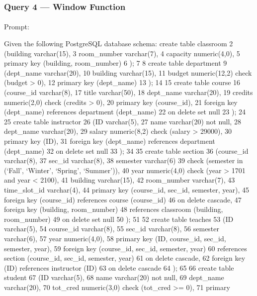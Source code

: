 \documentclass[
  letterpaper,
  DIV=11,
  numbers=noendperiod]{scrartcl}
\makeatletter
\let\oldparagraph\paragraph
\renewcommand{\paragraph}{
    \@ifstar
      \xxxParagraphStar
      \xxxParagraphNoStar
  }
\newcommand{\xxxParagraphStar}[1]{\oldparagraph*{#1}\mbox{}}
\newcommand{\xxxParagraphNoStar}[1]{\oldparagraph{#1}\mbox{}}
\makeatother
\begin{document}
\subsubsection{\texorpdfstring{\textbf{Query 4 ---} Window
Function}{Query 4 --- Window Function}}\label{query-4-window-function}

\paragraph{Prompt:}\label{prompt-3}

Given the following PostgreSQL database schema: create table classroom 2
(building varchar(15), 3 room\_number varchar(7), 4 capacity
numeric(4,0), 5 primary key (building, room\_number) 6 ); 7 8 create
table department 9 (dept\_name varchar(20), 10 building varchar(15), 11
budget numeric(12,2) check (budget \textgreater{} 0), 12 primary key
(dept\_name) 13 ); 14 15 create table course 16 (course\_id varchar(8),
17 title varchar(50), 18 dept\_name varchar(20), 19 credits numeric(2,0)
check (credits \textgreater{} 0), 20 primary key (course\_id), 21
foreign key (dept\_name) references department (dept\_name) 22 on delete
set null 23 ); 24 25 create table instructor 26 (ID varchar(5), 27 name
varchar(20) not null, 28 dept\_name varchar(20), 29 salary numeric(8,2)
check (salary \textgreater{} 29000), 30 primary key (ID), 31 foreign key
(dept\_name) references department (dept\_name) 32 on delete set null 33
); 34 35 create table section 36 (course\_id varchar(8), 37 sec\_id
varchar(8), 38 semester varchar(6) 39 check (semester in (`Fall',
`Winter', `Spring', `Summer')), 40 year numeric(4,0) check (year
\textgreater{} 1701 and year \textless{} 2100), 41 building varchar(15),
42 room\_number varchar(7), 43 time\_slot\_id varchar(4), 44 primary key
(course\_id, sec\_id, semester, year), 45 foreign key (course\_id)
references course (course\_id) 46 on delete cascade, 47 foreign key
(building, room\_number) 48 references classroom (building,
room\_number) 49 on delete set null 50 ); 51 52 create table teaches 53
(ID varchar(5), 54 course\_id varchar(8), 55 sec\_id varchar(8), 56
semester varchar(6), 57 year numeric(4,0), 58 primary key (ID,
course\_id, sec\_id, semester, year), 59 foreign key (course\_id,
sec\_id, semester, year) 60 references section (course\_id, sec\_id,
semester, year) 61 on delete cascade, 62 foreign key (ID) references
instructor (ID) 63 on delete cascade 64 ); 65 66 create table student 67
(ID varchar(5), 68 name varchar(20) not null, 69 dept\_name varchar(20),
70 tot\_cred numeric(3,0) check (tot\_cred \textgreater= 0), 71 primary
\end{document}
